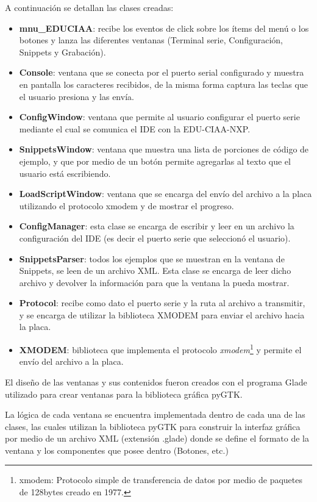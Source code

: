  A continuación se detallan las clases creadas:

\begin{itemize}
	\item \textbf{mnu\_EDUCIAA}: recibe los eventos de click sobre los ítems del menú o los botones y lanza las diferentes ventanas (Terminal serie, Configuración, Snippets y Grabación).
	\item \textbf{Console}: ventana que se conecta por el puerto serial configurado y muestra en pantalla los caracteres recibidos, de la misma forma captura las teclas que el usuario presiona y las envía.
	\item \textbf{ConfigWindow}: ventana que permite al usuario configurar el puerto serie mediante el cual se comunica el IDE con la EDU-CIAA-NXP.
	\item \textbf{SnippetsWindow}: ventana que muestra una lista de porciones de código de ejemplo, y que por medio de un botón permite agregarlas al texto que el usuario está escribiendo.
	\item \textbf{LoadScriptWindow}: ventana que se encarga del envío del archivo a la placa utilizando el protocolo xmodem y de mostrar el progreso.
	\item \textbf{ConfigManager}: esta clase se encarga de escribir y leer en un archivo la configuración del IDE (es decir el puerto serie que seleccionó el usuario).
	\item \textbf{SnippetsParser}: todos los ejemplos que se muestran en la ventana de Snippets, se leen de un archivo XML. Esta clase se encarga de leer dicho archivo y devolver la información para que la ventana la pueda mostrar.	
	\item \textbf{Protocol}: recibe como dato el puerto serie y la ruta al archivo a transmitir, y se encarga de utilizar la biblioteca XMODEM para enviar el archivo hacia la placa.
	\item \textbf{XMODEM}: biblioteca que implementa el protocolo \textit{xmodem}\footnote{xmodem: Protocolo simple de transferencia de datos por medio de paquetes de 128bytes creado en 1977.} y permite el envío del archivo a la placa.	
\end{itemize}

El diseño de las ventanas y sus contenidos fueron creados con el programa Glade\cite{glade} utilizado para crear ventanas para la biblioteca gráfica pyGTK.

La lógica de cada ventana se encuentra implementada dentro de cada una de las clases, las cuales utilizan la biblioteca pyGTK para construir la interfaz gráfica por medio de un archivo XML (extensión .glade) donde se define el formato de la ventana y los componentes que posee dentro (Botones, etc.)


